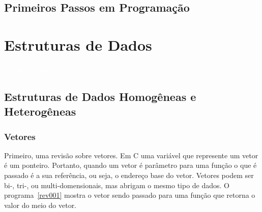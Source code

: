 \documentclass[11pt,fleqn]{book} %
\begin{document}
\newpage
\section{Primeiros Passos em Programação}\label{disc:primeirospassos}

\label{prog001}



\chapter{Estruturas de Dados}\label{estrutura}
\vspace{6em}
\begin{flushright}
	\textit{\textcolor{white}{Um bonita citação...}}
\end{flushright}
\vspace{12em}

\newpage
\section{Estruturas de Dados Homogêneas e Heterogêneas}\label{tipos}

\subsection*{Vetores}

Primeiro, uma revisão sobre vetores.
Em C uma variável que represente um vetor é um ponteiro.
Portanto, quando um vetor é parâmetro para uma função o que é passado é a sua referência, ou seja, o endereço base do vetor.
Vetores podem ser bi-, tri-, ou multi-domensionais, mas abrigam o mesmo tipo de dados.
O programa~\ref{rev001} mostra o vetor sendo passado para uma função que retorna o valor do meio do vetor.

\label{rev001}

\label{rev003}
\end{document}

